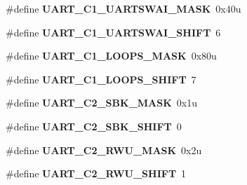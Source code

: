 \begin{DoxyCompactItemize}
\item 
\hypertarget{group___u_a_r_t___register___masks_ga466f5bf7b0cd3c3517da3a6c6a9baaac}{}\#define {\bfseries U\+A\+R\+T\+\_\+\+C1\+\_\+\+U\+A\+R\+T\+S\+W\+A\+I\+\_\+\+M\+A\+S\+K}~0x40u\label{group___u_a_r_t___register___masks_ga466f5bf7b0cd3c3517da3a6c6a9baaac}

\item 
\hypertarget{group___u_a_r_t___register___masks_gac7888d995fd947613eea08bdee534ffc}{}\#define {\bfseries U\+A\+R\+T\+\_\+\+C1\+\_\+\+U\+A\+R\+T\+S\+W\+A\+I\+\_\+\+S\+H\+I\+F\+T}~6\label{group___u_a_r_t___register___masks_gac7888d995fd947613eea08bdee534ffc}

\item 
\hypertarget{group___u_a_r_t___register___masks_ga08f1bbd905640d81967f9fb6d4ed8ec8}{}\#define {\bfseries U\+A\+R\+T\+\_\+\+C1\+\_\+\+L\+O\+O\+P\+S\+\_\+\+M\+A\+S\+K}~0x80u\label{group___u_a_r_t___register___masks_ga08f1bbd905640d81967f9fb6d4ed8ec8}

\item 
\hypertarget{group___u_a_r_t___register___masks_gac6beea8a7bad0b0fc3c3535f629fcf3a}{}\#define {\bfseries U\+A\+R\+T\+\_\+\+C1\+\_\+\+L\+O\+O\+P\+S\+\_\+\+S\+H\+I\+F\+T}~7\label{group___u_a_r_t___register___masks_gac6beea8a7bad0b0fc3c3535f629fcf3a}

\item 
\hypertarget{group___u_a_r_t___register___masks_ga8d243e5b3a3ece12bdeca818bacb15ee}{}\#define {\bfseries U\+A\+R\+T\+\_\+\+C2\+\_\+\+S\+B\+K\+\_\+\+M\+A\+S\+K}~0x1u\label{group___u_a_r_t___register___masks_ga8d243e5b3a3ece12bdeca818bacb15ee}

\item 
\hypertarget{group___u_a_r_t___register___masks_ga94f62ff8a45a08ae54b40da725fb245b}{}\#define {\bfseries U\+A\+R\+T\+\_\+\+C2\+\_\+\+S\+B\+K\+\_\+\+S\+H\+I\+F\+T}~0\label{group___u_a_r_t___register___masks_ga94f62ff8a45a08ae54b40da725fb245b}

\item 
\hypertarget{group___u_a_r_t___register___masks_ga279868a42acca3c1eeba8c53bb94b208}{}\#define {\bfseries U\+A\+R\+T\+\_\+\+C2\+\_\+\+R\+W\+U\+\_\+\+M\+A\+S\+K}~0x2u\label{group___u_a_r_t___register___masks_ga279868a42acca3c1eeba8c53bb94b208}

\item 
\hypertarget{group___u_a_r_t___register___masks_gaa163993d547a96c2ea002ff52e6b0971}{}\#define {\bfseries U\+A\+R\+T\+\_\+\+C2\+\_\+\+R\+W\+U\+\_\+\+S\+H\+I\+F\+T}~1\label{group___u_a_r_t___register___masks_gaa163993d547a96c2ea002ff52e6b0971}


\end{DoxyCompactItemize}
